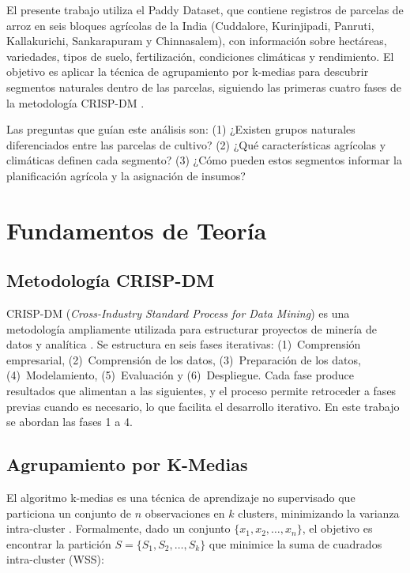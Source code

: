 \documentclass[10pt,a4paper]{article}
\begin{document}
El presente trabajo utiliza el Paddy Dataset, que contiene registros de parcelas de arroz en seis bloques agrícolas de la India (Cuddalore, Kurinjipadi, Panruti, Kallakurichi, Sankarapuram y Chinnasalem), con información sobre hectáreas, variedades, tipos de suelo, fertilización, condiciones climáticas y rendimiento. El objetivo es aplicar la técnica de agrupamiento por k-medias para descubrir segmentos naturales dentro de las parcelas, siguiendo las primeras cuatro fases de la metodología CRISP-DM \parencite{chapman2000}.

Las preguntas que guían este análisis son: (1) ¿Existen grupos naturales diferenciados entre las parcelas de cultivo? (2) ¿Qué características agrícolas y climáticas definen cada segmento? (3) ¿Cómo pueden estos segmentos informar la planificación agrícola y la asignación de insumos?

\section{Fundamentos de Teoría}

\subsection{Metodología CRISP-DM}

CRISP-DM (\textit{Cross-Industry Standard Process for Data Mining}) es una metodología ampliamente utilizada para estructurar proyectos de minería de datos y analítica \parencite{chapman2000}. Se estructura en seis fases iterativas: (1)~Comprensión empresarial, (2)~Comprensión de los datos, (3)~Preparación de los datos, (4)~Modelamiento, (5)~Evaluación y (6)~Despliegue. Cada fase produce resultados que alimentan a las siguientes, y el proceso permite retroceder a fases previas cuando es necesario, lo que facilita el desarrollo iterativo. En este trabajo se abordan las fases 1 a 4.

\subsection{Agrupamiento por K-Medias}

El algoritmo k-medias es una técnica de aprendizaje no supervisado que particiona un conjunto de $n$ observaciones en $k$ clusters, minimizando la varianza intra-cluster \parencite{macqueen1967,jain2010}. Formalmente, dado un conjunto $\{x_1, x_2, \ldots, x_n\}$, el objetivo es encontrar la partición $S = \{S_1, S_2, \ldots, S_k\}$ que minimice la suma de cuadrados intra-cluster (WSS):
\end{document}
